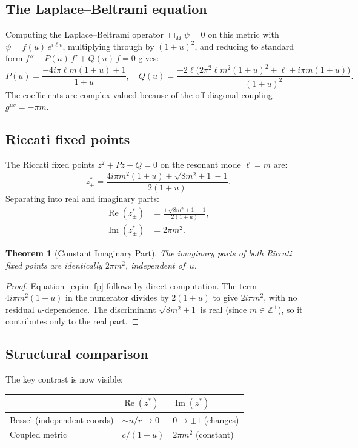 \documentclass{amsart}
\newtheorem{theorem}{Theorem}[section]
\theoremstyle{definition}
\theoremstyle{remark}
\begin{document}
\subsection{The Laplace--Beltrami equation}

Computing the Laplace--Beltrami operator $\Box_M\psi = 0$ on this metric with $\psi = f(u)\,e^{i\ell v}$, multiplying through by $(1{+}u)^2$, and reducing to standard form $f'' + P(u)\,f' + Q(u)\,f = 0$ gives:
\[
P(u) = \frac{-4i\pi\ell m(1{+}u) + 1}{1+u}, \quad
Q(u) = \frac{-2\ell\bigl(2\pi^2\ell m^2(1{+}u)^2 + \ell + i\pi m(1{+}u)\bigr)}{(1+u)^2}.
\]
The coefficients are complex-valued because of the off-diagonal coupling $g^{uv} = -\pi m$.

\subsection{Riccati fixed points}

The Riccati fixed points $z^2 + Pz + Q = 0$ on the resonant mode $\ell = m$ are:
\[
z^*_\pm = \frac{4i\pi m^2(1{+}u) \pm \sqrt{8m^2 + 1} - 1}{2(1+u)}.
\]
Separating into real and imaginary parts:
\begin{align}
\operatorname{Re}(z^*_\pm) &= \frac{\pm\sqrt{8m^2 + 1} - 1}{2(1+u)}, \label{eq:re-fp}\\
\operatorname{Im}(z^*_\pm) &= 2\pi m^2. \label{eq:im-fp}
\end{align}

\begin{theorem}[Constant Imaginary Part]\label{thm:const-im}
The imaginary parts of both Riccati fixed points are identically $2\pi m^2$, independent of~$u$.
\end{theorem}

\begin{proof}
Equation~\eqref{eq:im-fp} follows by direct computation. The term $4i\pi m^2(1{+}u)$ in the numerator divides by $2(1{+}u)$ to give $2i\pi m^2$, with no residual $u$-dependence. The discriminant $\sqrt{8m^2 + 1}$ is real (since $m \in \mathbb{Z}^+$), so it contributes only to the real part.
\end{proof}

\subsection{Structural comparison}

The key contrast is now visible:
\begin{center}
\begin{tabular}{lll}
\toprule
& $\operatorname{Re}(z^*)$ & $\operatorname{Im}(z^*)$ \\
\midrule
Bessel (independent coords) & $\sim n/r \to 0$ & $0 \to \pm 1$ (changes) \\
Coupled metric & $c/(1{+}u)$ & $2\pi m^2$ (constant) \\
\bottomrule
\end{tabular}
\end{center}
\end{document}
